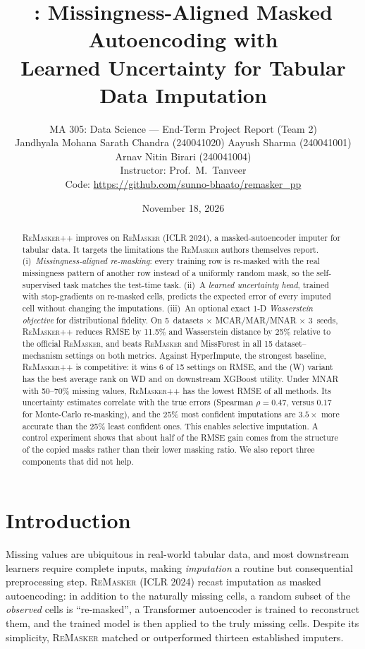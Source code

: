 \documentclass[11pt]{article}
\title{\rmpp: Missingness-Aligned Masked Autoencoding with\\ Learned Uncertainty for Tabular Data Imputation}
\author{MA 305: Data Science --- End-Term Project Report (Team 2)\\[4pt]
\small Jandhyala Mohana Sarath Chandra (240041020) \quad Aayush Sharma (240041001)\\ \small Arnav Nitin Birari (240041004)\\
\small Instructor: Prof.\ M.\ Tanveer\\ \small Code: \url{https://github.com/sunno-bhaato/remasker_pp}}
\date{November 18, 2026}
\newcommand{\rmpp}{\textsc{ReMasker++}}
\newcommand{\remasker}{\textsc{ReMasker}}
\begin{document}
\maketitle

\begin{abstract}
\rmpp{} improves on \remasker{} (ICLR 2024), a masked-autoencoder imputer for tabular data. It targets the limitations the \remasker{} authors themselves report. (i)~\emph{Missingness-aligned re-masking}: every training row is re-masked with the real missingness pattern of another row instead of a uniformly random mask, so the self-supervised task matches the test-time task. (ii)~A \emph{learned uncertainty head}, trained with stop-gradients on re-masked cells, predicts the expected error of every imputed cell without changing the imputations. (iii)~An optional exact 1-D \emph{Wasserstein objective} for distributional fidelity. On 5~datasets $\times$ MCAR/MAR/MNAR $\times$ 3~seeds, \rmpp{} reduces RMSE by 11.5\% and Wasserstein distance by 25\% relative to the official \remasker{}, and beats \remasker{} and MissForest in all 15 dataset--mechanism settings on both metrics. Against HyperImpute, the strongest baseline, \rmpp{} is competitive: it wins 6 of 15 settings on RMSE, and the (W) variant has the best average rank on WD and on downstream XGBoost utility. Under MNAR with 50--70\% missing values, \rmpp{} has the lowest RMSE of all methods. Its uncertainty estimates correlate with the true errors (Spearman $\rho=0.47$, versus $0.17$ for Monte-Carlo re-masking), and the 25\% most confident imputations are $3.5\times$ more accurate than the 25\% least confident ones. This enables selective imputation. A control experiment shows that about half of the RMSE gain comes from the structure of the copied masks rather than their lower masking ratio. We also report three components that did not help.
\end{abstract}

\section{Introduction}
Missing values are ubiquitous in real-world tabular data, and most downstream learners require complete inputs, making \emph{imputation} a routine but consequential preprocessing step. \remasker{} \citep{du2024} (ICLR 2024) recast imputation as masked autoencoding: in addition to the naturally missing cells, a random subset of the \emph{observed} cells is ``re-masked'', a Transformer autoencoder is trained to reconstruct them, and the trained model is then applied to the truly missing cells. Despite its simplicity, \remasker{} matched or outperformed thirteen established imputers.
\end{document}
